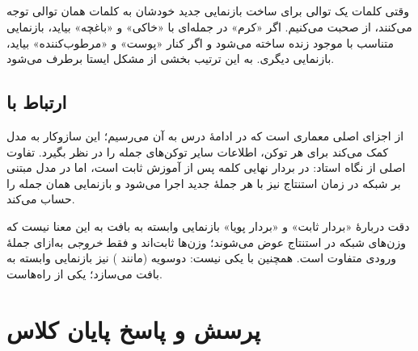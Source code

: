 \subsection{}
وقتی کلمات یک توالی برای ساخت بازنمایی جدید خودشان به کلمات همان توالی توجه می‌کنند، از  صحبت می‌کنیم. اگر «کرم» در جمله‌ای با «خاکی» و «باغچه» بیاید، بازنمایی متناسب با موجود زنده ساخته می‌شود و اگر کنار «پوست» و «مرطوب‌کننده» بیاید، بازنمایی دیگری. به این ترتیب بخشی از مشکل  ایستا برطرف می‌شود.

\subsection{ارتباط با }
 از اجزای اصلی معماری  است که در ادامهٔ درس به آن می‌رسیم؛ این سازوکار به مدل کمک می‌کند برای هر توکن، اطلاعات سایر توکن‌های جمله را در نظر بگیرد. تفاوت اصلی از نگاه استاد: در  بردار نهایی کلمه پس از آموزش ثابت است، اما در مدل مبتنی بر  شبکه در زمان استنتاج نیز با هر جملهٔ جدید اجرا می‌شود و بازنمایی همان جمله را حساب می‌کند.

\begin{correctionbox}{دقت دربارهٔ «بردار ثابت» و «بردار پویا»}
بازنمایی وابسته به بافت به این معنا نیست که وزن‌های شبکه در استنتاج عوض می‌شوند؛ وزن‌ها ثابت‌اند و فقط \emph{خروجی} به‌ازای جملهٔ ورودی متفاوت است. همچنین  با  یکی نیست:  دوسویه (مانند ) نیز بازنمایی وابسته به بافت می‌سازد؛  یکی از راه‌هاست.
\end{correctionbox}

\section{پرسش و پاسخ پایان کلاس}
\label{sec:qa}

